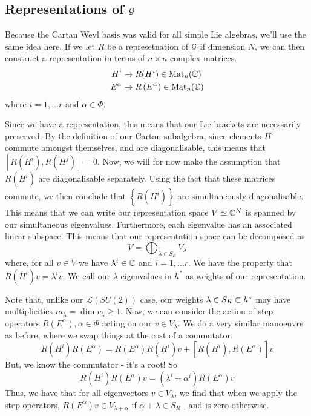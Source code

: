 \subsection{Representations of $ \mathcal{ G } $ } 
Because the Cartan Weyl basis was valid for all simple Lie algebras, 
we'll use the same idea here. 
If we let $ R $ be a represetnation of $ \mathcal{ G } $ if dimension $ N $, 
we can then construct a representation in terms of 
$ n \times n $ complex matrices. 
\begin{align*}
H ^ i & \to R ( H ^ i ) \in \text{Mat} _ n ( \mathbb{C} ) \\
E ^{ \alpha } & \to R \left(  E ^ \alpha  \right)  \in \text{Mat} _ n ( \mathbb{C}) 
\end{align*} where $ i = 1 , \dots r $ and $ \alpha \in \Phi $. 

Since we have a representation, this means
that our Lie brackets are necessarily preserved. By 
the definition of our Cartan subalgebra, since elements $ H ^i  $ 
commute amongst themselves, and are diagonalisable, this means 
that $ \left[  R \left(  H ^ i  \right)  , R \left( H ^ j  \right)    \right]   =0 $. 
Now, we will for now make the assumption that $ R \left(H ^ i   \right)  $
are diagonalisable separately. Using the 
fact that these matrices commute, we then conclude that 
$ \left\{  R (H ^ i ) \right\} $ are simultaneously diagonalisable. 
This means that we can write our representation space $ V \simeq \mathbb{C} ^{ N  }$ 	 
is spanned by our simultaneous eigenvalues. Furthermore, 
each eigenvalue has an associated linear subspace. 
This means that our representation space can be decomposed as 
\[
V = \bigoplus_{ \lambda \in S _ R } V _ \lambda 
\] where, for all $ v \in V $ we have $ \lambda ^ i \in \mathbb{C} $  
and $ i   = 1 , \dots r $. 
We have the property that $ R \left( H ^ i  \right)  v = \lambda ^ i v $.
We call our $ \lambda $ eigenvalues in $ h ^ * $ 
as weights of our representation. 

Note that, unlike our $ \mathcal{ L } ( SU ( 2 ) ) $ case, 
our weights $ \lambda \in S _ R \subset h ^ * $ 
may have multiplicities $ m _ \lambda  = \dim v _ \lambda \geq 1 $.  
Now, we can consider the action of 
step operators $ R\left(   E^ \alpha  \right)  , \alpha \in \Phi  $
acting on our $ v \in V _{ \lambda } $. 
We do a very similar manoeuvre as before, 
where we swap things at the cost of a commutator. 
\[
R \left( H ^ i  \right)  R \left( E ^ \alpha  \right)  = R \left( E ^ \alpha  \right)  
R \left( H ^ i  \right)  v + \left[  
R ( H ^ i ) , R \left( E ^ \alpha  \right)  \right]  v 
\]  But, we know the commutator - it's a root! 
So
\[
R \left( H ^ i  \right)  R \left( E ^ \alpha  \right)  v  = 
\left( \lambda ^ i + \alpha ^ i  \right)  R \left( E ^ \alpha  \right)  v 
\] Thus, we have 
that for all eigenvectors $ v \in V _ \lambda $, we find that 
when we apply the step operators, 
$ R \left(  E ^ \alpha \right)  v  \in V _{ \lambda + \alpha } $  if 
$ \alpha + \lambda \in  S_  R$ , and is zero otherwise. 

